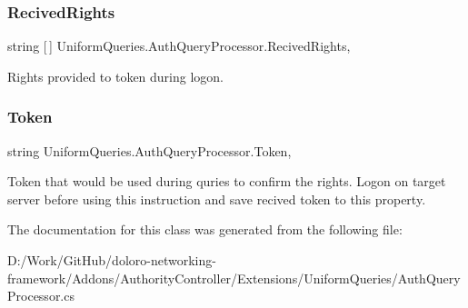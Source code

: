 \subsubsection{\texorpdfstring{Recived\+Rights}{RecivedRights}}
{\footnotesize\ttfamily string \mbox{[}$\,$\mbox{]} Uniform\+Queries.\+Auth\+Query\+Processor.\+Recived\+Rights\hspace{0.3cm}{\ttfamily [get]}, {}}



Rights provided to token during logon. 

\mbox{\label{class_uniform_queries_1_1_auth_query_processor_a6ff88b255dbd8916836a69ea086951f5}} 
\subsubsection{\texorpdfstring{Token}{Token}}
{\footnotesize\ttfamily string Uniform\+Queries.\+Auth\+Query\+Processor.\+Token\hspace{0.3cm}{\ttfamily [get]}, {\ttfamily [set]}}



Token that would be used during quries to confirm the rights. Logon on target server before using this instruction and save recived token to this property. 



The documentation for this class was generated from the following file\+:\begin{DoxyCompactItemize}
\item 
D\+:/\+Work/\+Git\+Hub/doloro-\/networking-\/framework/\+Addons/\+Authority\+Controller/\+Extensions/\+Uniform\+Queries/Auth\+Query\+Processor.\+cs\end{DoxyCompactItemize}
